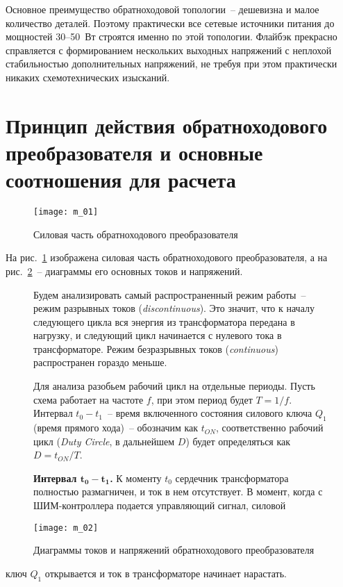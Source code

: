 Основное преимущество обратноходовой топологии~-- дешевизна и малое количество
деталей. Поэтому практически все сетевые источники питания до мощностей
30--50~Вт строятся именно по этой топологии. Флайбэк прекрасно справляется с
формированием нескольких выходных напряжений с неплохой стабильностью
дополнительных напряжений, не требуя при этом практически никаких
схемотехнических изысканий. \newpage

\section{Принцип действия обратноходового преобразователя и основные
соотношения для расчета}
\begin{figure}[h!]
	\center
	\texttt{[image: m\_01]}
	\parbox{.6\textwidth}{\caption{Силовая часть обратноходового
	преобразователя}\label{p01}}
\end{figure}
На рис.~\ref{p01} изображена силовая часть обратноходового преобразователя, а на
рис.~\ref{p02}~-- диаграммы его основных токов и напряжений.
		
\begin{figure}[h!]
	\begin{minipage}{.5\textwidth}
		Будем анализировать самый распространенный режим работы~-- режим
		разрывных токов (\emph{discontinuous}). Это значит, что к началу
		следующего цикла вся энергия из трансформатора передана в нагрузку, и
		следующий цикл начинается с нулевого тока в трансформаторе. Режим
		безразрывных токов (\emph{continuous}) распространен гораздо меньше.
		
		Для анализа разобьем рабочий цикл на отдельные периоды. Пусть схема
		работает на частоте \( f \), при этом период будет \( T = 1/f \).
		Интервал \( t_0 - t_1 \)~-- время включенного состояния силового ключа
		\( Q_1 \) (время прямого хода)~-- обозначим как \( t_{ON} \),
		соответственно рабочий цикл (\emph{Duty Circle}, в дальнейшем \( D \))
		будет определяться как \( D = t_{ON}/T \).
			 
		\textbf{Интервал \( \bm{t_0 - t_1} \).} К моменту \( t_0 \) сердечник
		трансформатора полностью размагничен, и ток в нем отсутствует. В момент,
		когда с ШИМ-контроллера подается управляющий сигнал, силовой
	\end{minipage} \hfill
	\begin{minipage}{.45\textwidth}
		\texttt{[image: m\_02]}
		\parbox{\textwidth}{\caption{Диаграммы токов и напряжений
		обратноходового преобразователя}\label{p02}}
	\end{minipage}
\end{figure}
\noindent ключ \( Q_1 \) открывается и ток в трансформаторе начинает нарастать.

